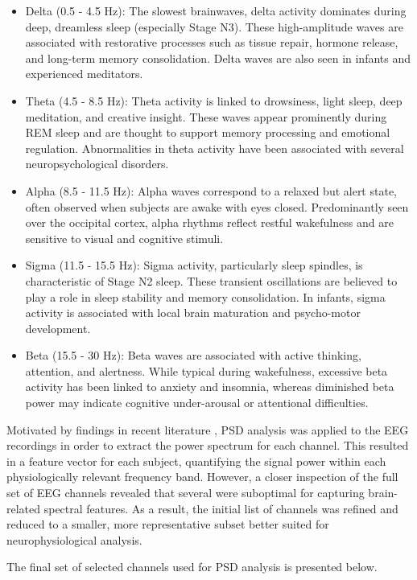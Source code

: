\begin{itemize}
	\item Delta (0.5 - 4.5 Hz): The slowest brainwaves, delta activity dominates during deep, dreamless sleep (especially Stage N3). These high-amplitude waves are associated with restorative processes such as tissue repair, hormone release, and long-term memory consolidation. Delta waves are also seen in infants and experienced meditators.
	\item Theta (4.5 - 8.5 Hz): Theta activity is linked to drowsiness, light sleep, deep meditation, and creative insight. These waves appear prominently during REM sleep and are thought to support memory processing and emotional regulation. Abnormalities in theta activity have been associated with several neuropsychological disorders.
	\item Alpha (8.5 - 11.5 Hz): Alpha waves correspond to a relaxed but alert state, often observed when subjects are awake with eyes closed. Predominantly seen over the occipital cortex, alpha rhythms reflect restful wakefulness and are sensitive to visual and cognitive stimuli.
	\item Sigma (11.5 - 15.5 Hz): Sigma activity, particularly sleep spindles, is characteristic of Stage N2 sleep. These transient oscillations are believed to play a role in sleep stability and memory consolidation. In infants, sigma activity is associated with local brain maturation and psycho-motor development.
	\item Beta (15.5 - 30 Hz): Beta waves are associated with active thinking, attention, and alertness. While typical during wakefulness, excessive beta activity has been linked to anxiety and insomnia, whereas diminished beta power may indicate cognitive under-arousal or attentional difficulties.
\end{itemize}

Motivated by findings in recent literature \cite{PSD}, PSD analysis was applied to the EEG recordings in order to extract the power spectrum for each channel. This resulted in a feature vector for each subject, quantifying the signal power within each physiologically relevant frequency band. However, a closer inspection of the full set of EEG channels revealed that several were suboptimal for capturing brain-related spectral features. As a result, the initial list of channels was refined and reduced to a smaller, more representative subset better suited for neurophysiological analysis.

The final set of selected channels used for PSD analysis is presented below.


